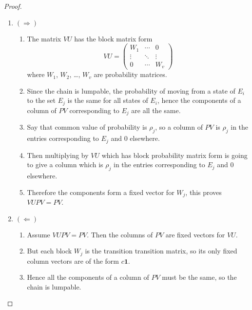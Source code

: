 \documentclass[12pt]{article}
\begin{document}
\begin{proof}
    \begin{enumerate}
        \item
            \( (\Rightarrow) \)
            \begin{enumerate}
                \item
                    The matrix \( VU \) has the block matrix form
                    \[
                        VU =
                        \begin{pmatrix}
                            W_1 & \cdots & 0 \\
                            \vdots & \ddots & \vdots \\
                            0 & \cdots & W_v
                        \end{pmatrix}
                    \] where \( W_1 \), \( W_2 \), \dots, \( W_v \) are
                    probability matrices.
                \item
                    Since the chain is lumpable, the probability of
                    moving from a state of \( E_i \) to the set \( E_j \)
                    is the same for all states of \( E_i \), hence the
                    components of a column of \( PV \) corresponding to \(
                    E_j \) are all the same.
                  \item
                    Say that common value of probability is \( \rho_j
                    \), so a column of \( PV \) is \( \rho_j\) in the
                    entries corresponding to \( E_j \) and \( 0 \)
                    elsewhere.
                  \item Then multiplying by \( VU \) which has block
                    probability matrix form is going to give  a column
                    which is \( \rho_j\) in the
                    entries corresponding to \( E_j \) and \( 0 \)
                    elsewhere.
                \item
                    Therefore the components form a fixed vector for \(
                    W_j \), this proves \( VUPV = PV \).
            \end{enumerate}
        \item
            \( (\Leftarrow) \)
            \begin{enumerate}
                \item
                    Assume \( VUPV = PV \).  Then the columns of \( PV \)
                    are fixed vectors for \( VU \).  
                  \item But each block \( W_j \)
                    is the transition transition matrix, so its
                    only fixed column vectors are of the form \( c
                    \mathbf{1} \).  
                  \item Hence all the components of a column
                    of \( PV \) must be the same, so the chain is
                    lumpable.
            \end{enumerate}
    \end{enumerate}
\end{proof}
 
\end{document}
